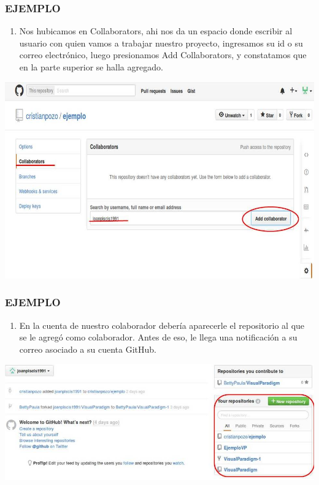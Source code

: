 \documentclass[8pt]{beamer}
\begin{document}
\begin{frame}
\frametitle{EJEMPLO}
\begin{enumerate}[15. ]
	\justifying
    \item Nos hubicamos en Collaborators, ahi nos da un espacio donde escribir al usuario con quien vamos a trabajar nuestro proyecto, ingresamos su id o su correo electrónico, luego presionamos Add Collaborators, y constatamos que en la parte superior se halla agregado.\\
\end{enumerate}
\begin{center}
\includegraphics[width=6 cm]{img/b25}\\
\fontsize{6}{1}
\end{center}
\end{frame}

\begin{frame}
\frametitle{EJEMPLO}
\begin{enumerate}[16. ]
	\justifying
    \item En la cuenta de nuestro colaborador debería aparecerle el repositorio al que se le agregó como colaborador. Antes de eso, le llega una notificación a su correo asociado a su cuenta GitHub. \\
\end{enumerate}
\begin{center}
\includegraphics[width=9 cm]{img/b26}\\
\fontsize{6}{1}
\end{center}
\end{frame}
\end{document}

